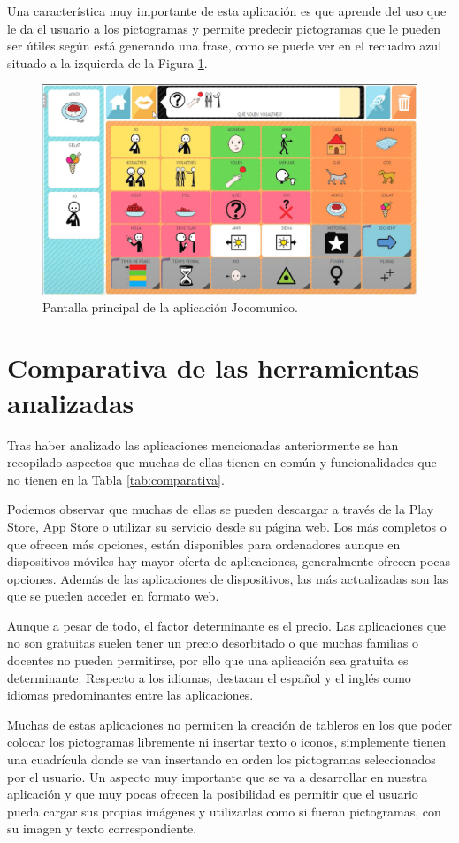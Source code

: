 Una característica muy importante de esta aplicación es que aprende del uso que le da el usuario a los pictogramas y permite predecir pictogramas que le pueden ser útiles según está generando una frase, como se puede ver en el recuadro azul situado a la izquierda de la Figura \ref{fig:jocomunico}.

\begin{figure}[h!]
	\centering
	\includegraphics[width=0.7\linewidth]{Imagenes/Bitmap/jocomunico}
	\caption{Pantalla principal de la aplicación Jocomunico.}
	\label{fig:jocomunico}
\end{figure}


\section{Comparativa de las herramientas analizadas}
\label{cap2:tablacomparativa}
Tras haber analizado las aplicaciones mencionadas anteriormente se han recopilado aspectos que muchas de ellas tienen en común y funcionalidades que no tienen en la Tabla \ref{tab:comparativa}.

Podemos observar que muchas de ellas se pueden descargar a través de la Play Store, App Store o utilizar su servicio desde su página web. Los más completos o que ofrecen más opciones, están disponibles para ordenadores aunque en dispositivos móviles hay mayor oferta  de aplicaciones, generalmente ofrecen pocas opciones. Además de las aplicaciones de dispositivos, las más actualizadas son las que se pueden acceder en formato web.

Aunque a pesar de todo, el factor determinante es el precio. Las aplicaciones que no son gratuitas suelen tener un precio desorbitado o que muchas familias o docentes no pueden permitirse, por ello que una aplicación sea gratuita es determinante. Respecto a los idiomas, destacan el español y el inglés como idiomas predominantes entre las aplicaciones. 

Muchas de estas aplicaciones no permiten la creación de tableros en los que poder colocar los pictogramas libremente ni insertar texto o iconos, simplemente tienen una cuadrícula donde se van insertando en orden los pictogramas seleccionados por el usuario. Un aspecto muy importante que se va a desarrollar en nuestra aplicación y que muy pocas ofrecen la posibilidad es permitir que el usuario pueda cargar sus propias imágenes y utilizarlas como si fueran pictogramas, con su imagen y texto correspondiente.


